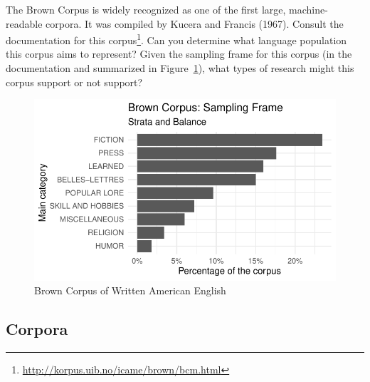 \documentclass[
  letterpaper,
]{scrbook}
\DeclareRobustCommand{\href}[2]{#2\footnote{\url{#1}}}
\begin{document}
\begin{tcolorbox}[enhanced jigsaw, title=\textcolor{quarto-callout-important-color}{\faExclamation}\hspace{0.5em}{Consider}, titlerule=0mm, toptitle=1mm, colbacktitle=quarto-callout-important-color!10!white, bottomtitle=1mm, left=2mm, colframe=quarto-callout-important-color-frame, breakable, toprule=.15mm, colback=white, opacitybacktitle=0.6, leftrule=.75mm, rightrule=.15mm, bottomrule=.15mm, arc=.35mm, coltitle=black, opacityback=0]

The Brown Corpus is widely recognized as one of the first large,
machine-readable corpora. It was compiled by Kucera and Francis (1967).
Consult the
\href{http://korpus.uib.no/icame/brown/bcm.html}{documentation for this
corpus}. Can you determine what language population this corpus aims to
represent? Given the sampling frame for this corpus (in the
documentation and summarized in Figure~\ref{fig-brown-distribution}),
what types of research might this corpus support or not support?

\end{tcolorbox}

\begin{figure}[h]

{\centering \includegraphics{./understanding-data_files/figure-pdf/fig-brown-distribution-1.pdf}

}

\caption{\label{fig-brown-distribution}Brown Corpus of Written American
English}

\end{figure}

\hypertarget{corpora}{%
\subsection{Corpora}\label{corpora}}
\end{document}
